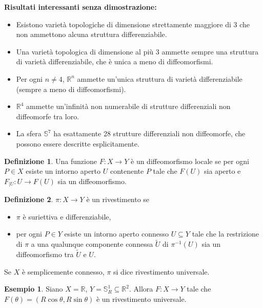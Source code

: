 \documentclass[a4paper,11pt]{article}
\theoremstyle{definition}
\newtheorem{definizione}{Definizione}[section]
\newtheorem{esempio}{Esempio}[section]
\theoremstyle{theorem}
\begin{document}
\textbf{Risultati interessanti senza dimostrazione:}
\begin{itemize}
	\item Esistono varietà topologiche di dimensione strettamente maggiore di 3 che non ammettono alcuna struttura differenziabile.
	\item Una varietà topologica di dimensione al più 3 ammette sempre una struttura di varietà differenziabile, che è unica a meno di diffeomorfismi.
	\item Per ogni $n\neq 4$, $\mathbb{R}^n$ ammette un'unica struttura di varietà differenziabile (sempre a meno di diffeomorfismi). 
	\item $\mathbb{R}^4$ ammette un'infinità non numerabile di strutture differenziali non diffeomorfe tra loro.
	\item La sfera $\mathbb{S}^7$ ha esattamente 28 strutture differenziali non diffeomorfe, che possono essere descritte esplicitamente.
\end{itemize}
\begin{definizione}
	Una funzione $F\colon X\to Y$ è un diffeomorfismo locale se per ogni $P\in X$ esiste un intorno aperto $U$ contenente $P$ tale che $F(U)$ sia aperto e $F_{|U}\colon U\to F(U)$ sia un diffeomorfismo.
\end{definizione}
\begin{definizione}
	$\pi\colon X\to Y$ è un rivestimento se
	\begin{itemize}
		\item $\pi$ è suriettiva e differenziabile,
		\item per ogni $P\in Y$ esiste un intorno aperto connesso $U\subseteq Y$ tale che la restrizione di $\pi$ a una qualunque componente connessa $\tilde U$ di $\pi^{-1}(U)$ sia un diffeomorfismo tra $\tilde{U}$ e $U$.
	\end{itemize}
	Se $X$ è semplicemente connesso, $\pi$ si dice rivestimento universale.
\end{definizione}
\begin{esempio}
	Siano $X=\mathbb{R}$, $Y=\mathbb{S}^1_R\subseteq\mathbb{R}^2$. Allora $F\colon X\to Y$ tale che $F(\theta)=(R\cos\theta,R\sin\theta)$ è un rivestimento universale.
\end{esempio}
\newpage
\end{document}
